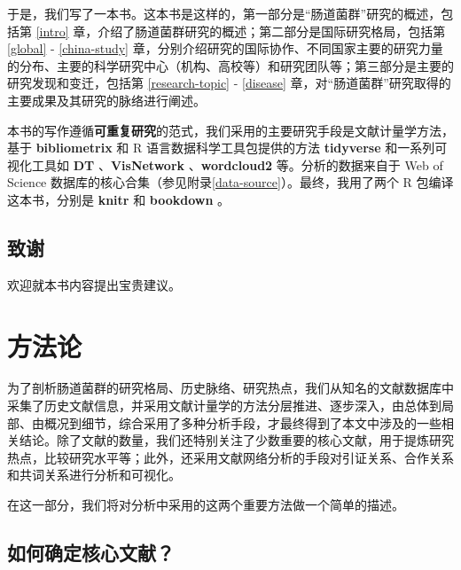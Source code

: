 \documentclass[]{ctexbook}
\begin{document}
于是，我们写了一本书。这本书是这样的，第一部分是``肠道菌群''研究的概述，包括第 \ref{intro} 章，介绍了肠道菌群研究的概述；第二部分是国际研究格局，包括第 \ref{global} - \ref{china-study} 章，分别介绍研究的国际协作、不同国家主要的研究力量的分布、主要的科学研究中心（机构、高校等）和研究团队等；第三部分是主要的研究发现和变迁，包括第 \ref{research-topic} - \ref{disease} 章，对``肠道菌群''研究取得的主要成果及其研究的脉络进行阐述。

本书的写作遵循\textbf{可重复研究}的范式，我们采用的主要研究手段是文献计量学方法，基于 \textbf{bibliometrix} \citep{R-bibliometrix} 和 R 语言数据科学工具包提供的方法 \textbf{tidyverse} 和一系列可视化工具如 \textbf{DT} \citep{R-DT}、\textbf{VisNetwork} \citep{R-visNetwork}、\textbf{wordcloud2} \citep{R-wordcloud2} 等。分析的数据来自于 Web of Science 数据库的核心合集（参见附录\ref{data-source}）。最终，我用了两个 R 包编译这本书，分别是 \textbf{knitr} \citep{xie2015} 和 \textbf{bookdown} \citep{R-bookdown}。

\hypertarget{ux81f4ux8c22}{%
\section*{致谢}\label{ux81f4ux8c22}}


欢迎就本书内容提出宝贵建议。

\mainmatter

\hypertarget{method}{%
\chapter{方法论}\label{method}}

为了剖析肠道菌群的研究格局、历史脉络、研究热点，我们从知名的文献数据库中采集了历史文献信息，并采用文献计量学的方法分层推进、逐步深入，由总体到局部、由概况到细节，综合采用了多种分析手段，才最终得到了本文中涉及的一些相关结论。除了文献的数量，我们还特别关注了少数重要的核心文献，用于提炼研究热点，比较研究水平等；此外，还采用文献网络分析的手段对引证关系、合作关系和共词关系进行分析和可视化。

在这一部分，我们将对分析中采用的这两个重要方法做一个简单的描述。

\hypertarget{ux5982ux4f55ux786eux5b9aux6838ux5fc3ux6587ux732e}{%
\section{如何确定核心文献？}\label{ux5982ux4f55ux786eux5b9aux6838ux5fc3ux6587ux732e}}
\end{document}
